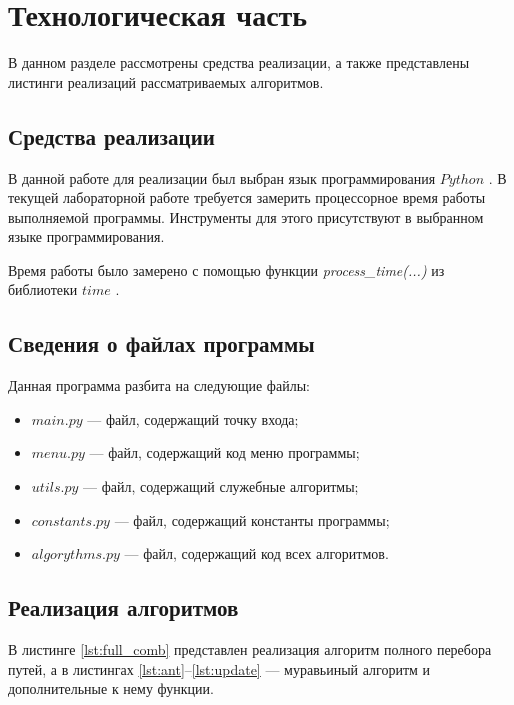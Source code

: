 \chapter{Технологическая часть}

В данном разделе рассмотрены средства реализации, а также представлены листинги реализаций рассматриваемых алгоритмов.

\section{Средства реализации}

В данной работе для реализации был выбран язык программирования $Python$ \cite{python-lang}.
В текущей лабораторной работе требуется замерить процессорное время работы выполняемой программы.
Инструменты для этого присутствуют в выбранном языке программирования.

Время работы было замерено с помощью функции \textit{process\_time(...)} из библиотеки $time$ \cite{python-lang-time}.


\section{Сведения о файлах программы}

Данная программа разбита на следующие файлы:
\begin{itemize}
	\item $main.py$ --- файл, содержащий точку входа;
	\item $menu.py$ --- файл, содержащий код меню программы;
	\item $utils.py$ --- файл, содержащий служебные алгоритмы;
	\item $constants.py$ --- файл, содержащий константы программы;
	\item $algorythms.py$ --- файл, содержащий код всех алгоритмов.
\end{itemize}

\section{Реализация алгоритмов}

В листинге \ref{lst:full_comb} представлен реализация алгоритм полного перебора путей, а в листингах \ref{lst:ant}--\ref{lst:update} --- муравьиный алгоритм и дополнительные к нему функции.




